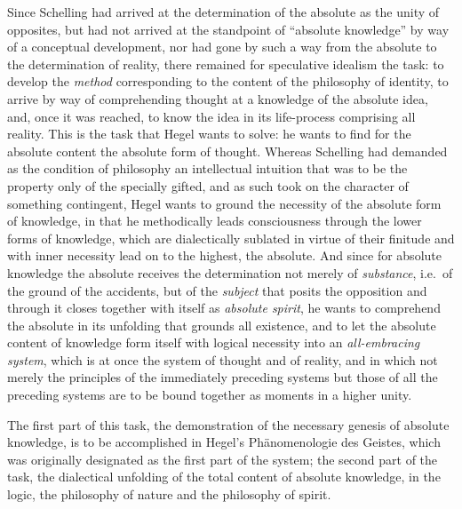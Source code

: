 \divrule

Since Schelling had arrived at the determination of the absolute as the
unity of opposites, but had not arrived at the standpoint of ``absolute
knowledge'' by way of a conceptual development, nor had gone by such a
way from the absolute to the determination of reality, there remained
for speculative idealism the task: to develop the \emph{method}
corresponding to the content of the philosophy of identity, to arrive
by way of comprehending thought at a knowledge of the absolute idea,
and, once it was reached, to know the idea in its life-process
comprising all reality. This is the task that Hegel wants to solve: he
wants to find for the absolute content the absolute form of thought.
Whereas Schelling had demanded as the condition of philosophy an
intellectual intuition that was to be the property only of the
specially gifted, and as such took on the character of something
contingent, Hegel wants to ground the necessity of the absolute form of
knowledge, in that he methodically leads consciousness through the
lower forms of knowledge, which are dialectically sublated in virtue of
their finitude and with inner necessity lead on to the highest, the
absolute. And since for absolute knowledge the absolute receives the
determination not merely of \emph{substance}, i.e.\ of the
ground of the accidents, but of the \emph{subject} that posits the
opposition and through it closes together with itself as \emph{absolute
spirit}, he wants to comprehend the absolute in its unfolding that
grounds all existence, and to let the absolute content of knowledge
form itself with logical necessity into an \emph{all-embracing system},
which is at once the system of thought and of reality, and in which not
merely the principles of the immediately preceding systems but those of
all the preceding systems are to be bound together as moments in a
higher unity.

The first part of this task, the demonstration of the necessary genesis
of absolute knowledge, is to be accomplished in Hegel's Phänomenologie
des Geistes, which was originally designated as the first part of the
system; the second part of the task, the dialectical unfolding of the
total content of absolute knowledge, in the logic, the philosophy of
nature and the philosophy of spirit.

\divrule

